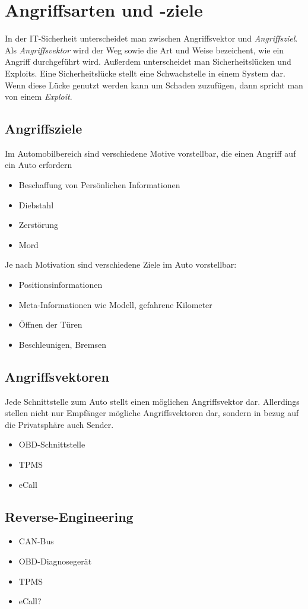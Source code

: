 \section{Angriffsarten und -ziele}

In der IT-Sicherheit unterscheidet man zwischen Angriffsvektor und
\textit{Angriffsziel}. Als \textit{Angriffsvektor} wird der Weg sowie die Art
und Weise bezeichent, wie ein Angriff durchgeführt wird\cite{Sambleben2012,Metasploit2012}.
Außerdem unterscheidet man Sicherheitslücken und Exploits. Eine
Sicherheitslücke stellt eine Schwachstelle in einem System dar. Wenn diese
Lücke genutzt werden kann um Schaden zuzufügen, dann spricht man von einem
\textit{Exploit}.


\subsection{Angriffsziele}
Im Automobilbereich sind verschiedene Motive vorstellbar, die einen Angriff
auf ein Auto erfordern

\begin{itemize}
    \item Beschaffung von Persönlichen Informationen
    \item Diebstahl
    \item Zerstörung
    \item Mord
\end{itemize}

Je nach Motivation sind verschiedene Ziele im Auto vorstellbar:

\begin{itemize}
    \item Positionsinformationen
    \item Meta-Informationen wie Modell, gefahrene Kilometer
    \item Öffnen der Türen
    \item Beschleunigen, Bremsen
\end{itemize}


\subsection{Angriffsvektoren}
Jede Schnittstelle zum Auto stellt einen möglichen Angriffsvektor dar.
Allerdings stellen nicht nur Empfänger mögliche Angriffsvektoren dar, sondern
in bezug auf die Privatsphäre auch Sender.

\begin{itemize}
    \item OBD-Schnittstelle
    \item TPMS
    \item eCall
\end{itemize}

\subsection{Reverse-Engineering}
\begin{itemize}
    \item CAN-Bus
    \item OBD-Diagnosegerät
    \item TPMS
    \item eCall?
\end{itemize}
